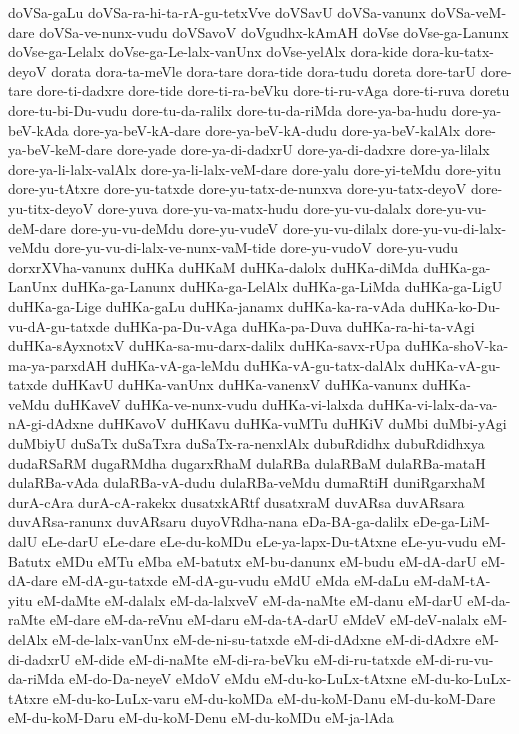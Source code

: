 {doVSa-gaLu
doVSa-ra-hi-ta-rA-gu-tetxVve
doVSavU
doVSa-vanunx
doVSa-veM-dare
doVSa-ve-nunx-vudu
doVSavoV
doVgudhx-kAmAH
doVse
doVse-ga-Lanunx
doVse-ga-Lelalx
doVse-ga-Le-lalx-vanUnx
doVse-yelAlx
dora-kide
dora-ku-tatx-deyoV
dorata
dora-ta-meVle
dora-tare
dora-tide
dora-tudu
doreta
dore-tarU
dore-tare
dore-ti-dadxre
dore-tide
dore-ti-ra-beVku
dore-ti-ru-vAga
dore-ti-ruva
doretu
dore-tu-bi-Du-vudu
dore-tu-da-ralilx
dore-tu-da-riMda
dore-ya-ba-hudu
dore-ya-beV-kAda
dore-ya-beV-kA-dare
dore-ya-beV-kA-dudu
dore-ya-beV-kalAlx
dore-ya-beV-keM-dare
dore-yade
dore-ya-di-dadxrU
dore-ya-di-dadxre
dore-ya-lilalx
dore-ya-li-lalx-valAlx
dore-ya-li-lalx-veM-dare
dore-yalu
dore-yi-teMdu
dore-yitu
dore-yu-tAtxre
dore-yu-tatxde
dore-yu-tatx-de-nunxva
dore-yu-tatx-deyoV
dore-yu-titx-deyoV
dore-yuva
dore-yu-va-matx-hudu
dore-yu-vu-dalalx
dore-yu-vu-deM-dare
dore-yu-vu-deMdu
dore-yu-vudeV
dore-yu-vu-dilalx
dore-yu-vu-di-lalx-veMdu
dore-yu-vu-di-lalx-ve-nunx-vaM-tide
dore-yu-vudoV
dore-yu-vudu
dorxrXVha-vanunx
duHKa
duHKaM
duHKa-dalolx
duHKa-diMda
duHKa-ga-LanUnx
duHKa-ga-Lanunx
duHKa-ga-LelAlx
duHKa-ga-LiMda
duHKa-ga-LigU
duHKa-ga-Lige
duHKa-gaLu
duHKa-janamx
duHKa-ka-ra-vAda
duHKa-ko-Du-vu-dA-gu-tatxde
duHKa-pa-Du-vAga
duHKa-pa-Duva
duHKa-ra-hi-ta-vAgi
duHKa-sAyxnotxV
duHKa-sa-mu-darx-dalilx
duHKa-savx-rUpa
duHKa-shoV-ka-ma-ya-parxdAH
duHKa-vA-ga-leMdu
duHKa-vA-gu-tatx-dalAlx
duHKa-vA-gu-tatxde
duHKavU
duHKa-vanUnx
duHKa-vanenxV
duHKa-vanunx
duHKa-veMdu
duHKaveV
duHKa-ve-nunx-vudu
duHKa-vi-lalxda
duHKa-vi-lalx-da-va-nA-gi-dAdxne
duHKavoV
duHKavu
duHKa-vuMTu
duHKiV
duMbi
duMbi-yAgi
duMbiyU
duSaTx
duSaTxra
duSaTx-ra-nenxlAlx
dubuRdidhx
dubuRdidhxya
dudaRSaRM
dugaRMdha
dugarxRhaM
dulaRBa
dulaRBaM
dulaRBa-mataH
dulaRBa-vAda
dulaRBa-vA-dudu
dulaRBa-veMdu
dumaRtiH
duniRgarxhaM
durA-cAra
durA-cA-rakekx
dusatxkARtf
dusatxraM
duvARsa
duvARsara
duvARsa-ranunx
duvARsaru
duyoVRdha-nana
eDa-BA-ga-dalilx
eDe-ga-LiM-dalU
eLe-darU
eLe-dare
eLe-du-koMDu
eLe-ya-lapx-Du-tAtxne
eLe-yu-vudu
eM-Batutx
eMDu
eMTu
eMba
eM-batutx
eM-bu-danunx
eM-budu
eM-dA-darU
eM-dA-dare
eM-dA-gu-tatxde
eM-dA-gu-vudu
eMdU
eMda
eM-daLu
eM-daM-tA-yitu
eM-daMte
eM-dalalx
eM-da-lalxveV
eM-da-naMte
eM-danu
eM-darU
eM-da-raMte
eM-dare
eM-da-reVnu
eM-daru
eM-da-tA-darU
eMdeV
eM-deV-nalalx
eM-delAlx
eM-de-lalx-vanUnx
eM-de-ni-su-tatxde
eM-di-dAdxne
eM-di-dAdxre
eM-di-dadxrU
eM-dide
eM-di-naMte
eM-di-ra-beVku
eM-di-ru-tatxde
eM-di-ru-vu-da-riMda
eM-do-Da-neyeV
eMdoV
eMdu
eM-du-ko-LuLx-tAtxne
eM-du-ko-LuLx-tAtxre
eM-du-ko-LuLx-varu
eM-du-koMDa
eM-du-koM-Danu
eM-du-koM-Dare
eM-du-koM-Daru
eM-du-koM-Denu
eM-du-koMDu
eM-ja-lAda
}
